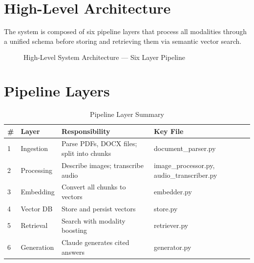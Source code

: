 \documentclass[12pt,a4paper]{report}
\begin{document}
\section{High-Level Architecture}

The system is composed of six pipeline layers that process all modalities through a unified schema before storing and retrieving them via semantic vector search.

\begin{figure}[H]
    \centering
    \caption{High-Level System Architecture --- Six Layer Pipeline}
    \label{fig:architecture}
\end{figure}

\section{Pipeline Layers}

\begin{table}[H]
\centering
\caption{Pipeline Layer Summary}
\begin{tabularx}{\textwidth}{p{1cm}p{3.5cm}Xp{3cm}}
\toprule
\textbf{\#} & \textbf{Layer} & \textbf{Responsibility} & \textbf{Key File} \\
\midrule
1 & Ingestion & Parse PDFs, DOCX files; split into chunks & document\_parser.py \\
2 & Processing & Describe images; transcribe audio & image\_processor.py, audio\_transcriber.py \\
3 & Embedding & Convert all chunks to vectors & embedder.py \\
4 & Vector DB & Store and persist vectors & store.py \\
5 & Retrieval & Search with modality boosting & retriever.py \\
6 & Generation & Claude generates cited answers & generator.py \\
\bottomrule
\end{tabularx}
\end{table}
\end{document}
